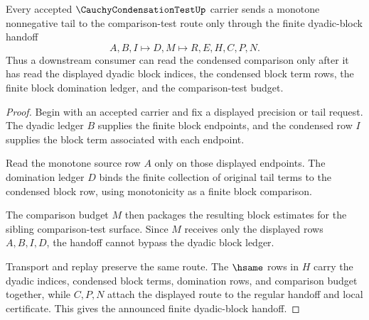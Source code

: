 \begin{theorem}
\label{thm:cauchy-condensation-test-dyadic-block-handoff}
Every accepted $\CauchyCondensationTestUp$ carrier sends a monotone nonnegative tail to the comparison-test route only through the finite dyadic-block handoff
$$
A,B,I\longmapsto D,M\longmapsto R,E,H,C,P,N.
$$
Thus a downstream consumer can read the condensed comparison only after it has read the displayed dyadic block indices, the condensed block term rows, the finite block domination ledger, and the comparison-test budget.
\end{theorem}
\begin{proof}
Begin with an accepted carrier and fix a displayed precision or tail request. The dyadic ledger $B$ supplies the finite block endpoints, and the condensed row $I$ supplies the block term associated with each endpoint.

Read the monotone source row $A$ only on those displayed endpoints. The domination ledger $D$ binds the finite collection of original tail terms to the condensed block row, using monotonicity as a finite block comparison.

The comparison budget $M$ then packages the resulting block estimates for the sibling comparison-test surface. Since $M$ receives only the displayed rows $A,B,I,D$, the handoff cannot bypass the dyadic block ledger.

Transport and replay preserve the same route. The $\hsame$ rows in $H$ carry the dyadic indices, condensed block terms, domination rows, and comparison budget together, while $C,P,N$ attach the displayed route to the regular handoff and local certificate. This gives the announced finite dyadic-block handoff.
\end{proof}

